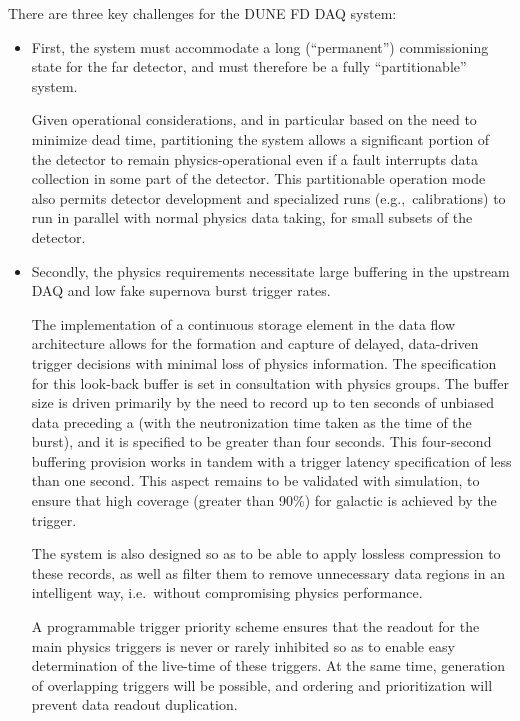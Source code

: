 There are three key challenges for the DUNE FD DAQ system: 
\begin{itemize}
\item First, the system must accommodate
a long (``permanent'') commissioning state for the far detector, and
must therefore be a fully ``partitionable'' system. 

Given operational considerations, and in particular based
on the need to minimize  dead time, partitioning the  system allows 
a significant portion of the detector to remain physics-operational
even if a fault interrupts data collection in
some part of the detector. 
This partitionable operation mode also
permits detector development and specialized runs (e.g.,~calibrations)
to run in parallel with normal physics data taking, for small subsets
of the detector.

\item Secondly, the   physics
requirements necessitate large buffering in the upstream DAQ and low fake
supernova burst trigger rates. 

The implementation of a continuous storage element in the data flow
architecture allows for the formation and capture of delayed, data-driven
trigger decisions with minimal loss of physics information. The
specification for this look-back buffer is set in consultation with
physics groups. The buffer size is driven primarily by the need to record up to ten
seconds of unbiased data preceding a  (with the
neutronization time taken as the time of the burst), and it is
specified to be greater than four seconds. This four-second
buffering provision works in tandem with a trigger latency
specification of less than one second. This aspect remains to be validated
with simulation, to ensure that high coverage (greater than 90\%) for galactic  is achieved by the  trigger.

The  system is also designed so as to be able to %
apply lossless compression to these records, as well as
filter them %
to remove unnecessary data regions
in an intelligent way, i.e.~without compromising physics performance.

A programmable trigger priority scheme ensures %
that the readout for the main physics triggers
is never or rarely inhibited so as %
to enable easy determination of the live-time of
these triggers. %
At the same time, generation
of overlapping triggers will be possible, %
and ordering and prioritization will %
prevent data readout duplication. 


\end{itemize}

